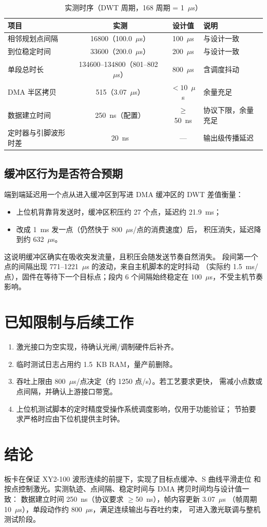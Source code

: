 \documentclass[UTF8,a4paper,11pt]{ctexart}
\begin{document}
\begin{table}[htbp]
\centering
\caption{实测时序（DWT 周期，168 周期 = 1~$\mu$s）}
\begin{tabularx}{\textwidth}{@{}lccX@{}}
\toprule
项目 & 实测 & 设计值 & 说明 \\
\midrule
相邻规划点间隔 & 16800（100.0~$\mu$s） & 100~$\mu$s & 与设计一致 \\
到位稳定时间 & 33600（200.0~$\mu$s） & 200~$\mu$s & 与设计一致 \\
单段总时长 & 134600--134800（801--802~$\mu$s） & 800~$\mu$s & 含调度抖动 \\
DMA 半区拷贝 & 515（3.07~$\mu$s） & $<10$~$\mu$s & 余量充足 \\
数据建立时间 & 250~ns（配置） & $\ge$50~ns & 协议下限，余量充足 \\
定时器与引脚波形时差 & 20~ns & --- & 输出级传播延迟 \\
\bottomrule
\end{tabularx}
\end{table}

\subsection{缓冲区行为是否符合预期}

端到端延迟用一个点从进入缓冲区到写进 DMA 缓冲区的 DWT 差值衡量：

\begin{itemize}
  \item 上位机背靠背发送时，缓冲区积压约 27 个点，延迟约 21.9~ms；
  \item 改成 1~ms 发一点（仍然快于 800~$\mu$s/点的消费速度）后，
        积压消失，延迟降到约 632~$\mu$s。
\end{itemize}

这说明缓冲区确实在吸收突发流量，且积压会随发送节奏自然消失。
段间第一个点的间隔出现 771--1221~$\mu$s 的波动，来自主机脚本的定时抖动
（实际约 1.5~ms/点），固件在等待下一个目标点；段内 6 个间隔始终稳定在
100~$\mu$s，不受主机节奏影响。

\section{已知限制与后续工作}

\begin{enumerate}
  \item 激光接口为空实现，待确认光闸/调制硬件后补齐。
  \item 临时测试日志占用约 1.5~KB RAM，量产前删除。
  \item 吞吐上限由 800~$\mu$s/点决定（约 1250 点/s）。若工艺要求更快，
        需减小点数或点间隔，并确认上游接口带宽。
  \item 上位机测试脚本的定时精度受操作系统调度影响，仅用于功能验证；
        节拍要求严格时应由下位机提供主时钟。
\end{enumerate}

\section{结论}

板卡在保证 XY2-100 波形连续的前提下，实现了目标点缓冲、S 曲线平滑走位
和按点控制激光。实测轨迹、点间隔、稳定时间与 DMA 拷贝时间均与设计值一致：
数据建立时间 250~ns（协议要求 $\ge$50~ns），帧内容更新 3.07~$\mu$s
（帧周期 10~$\mu$s），单段动作约 800~$\mu$s，满足连续输出与吞吐约束，
可进入激光联调与整机测试阶段。
\end{document}
